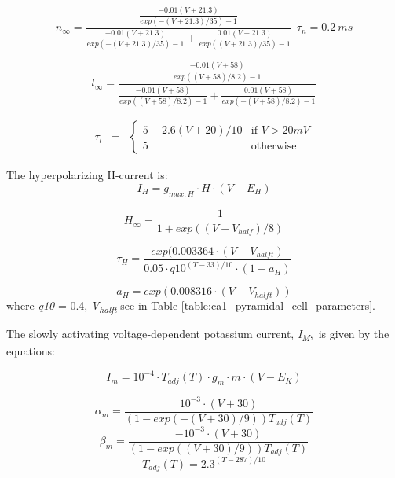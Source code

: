 \documentclass[a4paper,12pt]{article}
\begin{document}
\begin{equation}
n_{\infty} = \frac{\frac{-0.01(V+21.3)}{exp(-(V+21.3)/35)-1}}{\frac{-0.01(V+21.3)}{exp(-(V+21.3)/35)-1} + \frac{0.01(V+21.3)}{exp( (V+21.3)/35)-1} } \ \ \tau_n=0.2 \ ms
\end{equation}

\begin{equation}
l_{\infty} = \frac{\frac{-0.01(V+58)}{exp( (V+58)/8.2)-1}}{\frac{-0.01(V+58)}{exp( (V+58)/8.2)-1} + \frac{0.01(V+58)}{exp(-(V+58)/8.2)-1}}
\end{equation}

\begin{equation}
\begin{matrix}
\tau_l & =
& \left\{
\begin{matrix}
5+2.6(V+20)/10 & \mbox{if } V > 20 mV \\
5 & \mbox{otherwise }
\end{matrix} \right.
\end{matrix}
\end{equation}


The hyperpolarizing H-current is:
\begin{equation}
I_H=g_{max, H} \cdot H \cdot (V-E_H)
\end{equation}

\begin{equation}
H_{\infty }=\frac {1}{1+exp((V-V_{half})/8)}  
\end{equation}

\begin{equation}
\tau_{H}=\frac{exp( 0.003364\cdot
	(V-V_{halft})}{0.05 \cdot q10^{(T-33)/10} \cdot
	(1+a_{H})}
\end{equation}


\begin{equation}
a_{H}=exp( 0.008316 \cdot (V-V_{halft}))
\end{equation}
where \textit{q10} =  0.4, \textit{V\textsubscript{halft}}
see in Table \ref{table:ca1_pyramidal_cell_parameters}.

The slowly activating voltage‑dependent potassium current, \textit{I}\textit{\textsubscript{M}},~is given by the
equations:


\begin{equation}
I_m=10^{-4}\cdot T_{adj}(T)\cdot g_m\cdot m\cdot
(V-E_K)
\end{equation}


\begin{equation}
\alpha_m =  \frac{10^{-3}\cdot(V+30)}{(1-exp(-(V+30)/9))T_{adj}(T)} 
\end{equation}
\begin{equation}
\beta_m = \frac{ -10^{-3}\cdot(V+30)}{(1-exp((V+30)/9))T_{adj}(T)}
\end{equation}
\begin{equation}
T_{adj}(T)=2.3^{(T - 287)/10}
\end{equation}
\end{document}
